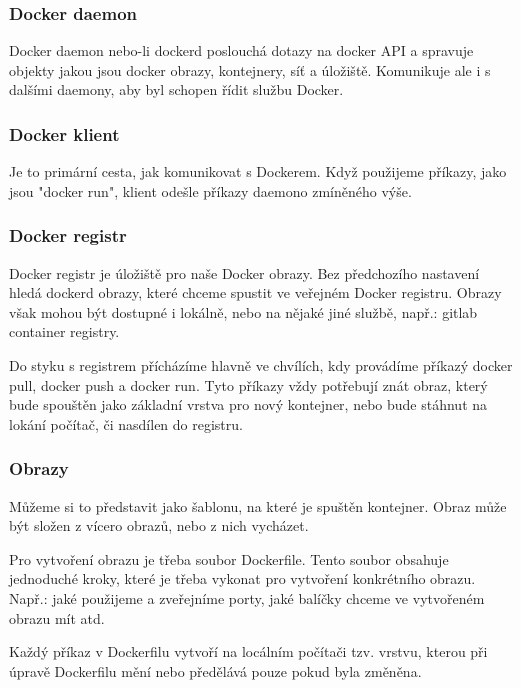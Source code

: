 \subsubsection{Docker daemon}

Docker daemon nebo-li dockerd poslouchá dotazy na docker API a spravuje objekty jakou jsou docker obrazy, kontejnery, síť a úložiště. Komunikuje ale i s dalšími daemony, aby byl schopen řídit službu Docker.

\subsubsection{Docker klient}

Je to primární cesta, jak komunikovat s Dockerem. Když použijeme příkazy, jako jsou "docker run", klient odešle příkazy daemono zmíněného výše. 

\subsubsection{Docker registr}

Docker registr je úložiště pro naše Docker obrazy. Bez předchozího nastavení hledá dockerd obrazy, které chceme spustit ve veřejném Docker registru. Obrazy však mohou být dostupné i lokálně, nebo na nějaké jiné službě, např.: gitlab container registry. 

Do styku s registrem přícházíme hlavně ve chvílích, kdy provádíme příkazý docker pull, docker push a docker run. Tyto příkazy vždy potřebují znát obraz, který bude spouštěn jako základní vrstva pro nový kontejner, nebo bude stáhnut na lokání počítač, či nasdílen do registru.

\subsubsection{Obrazy}

Můžeme si to představit jako šablonu, na které je spuštěn kontejner. Obraz může být složen z vícero obrazů, nebo z nich vycházet. 

Pro vytvoření obrazu je třeba soubor Dockerfile. Tento soubor obsahuje jednoduché kroky, které je třeba vykonat pro vytvoření konkrétního obrazu. Např.: jaké použijeme a zveřejníme porty, jaké balíčky chceme ve vytvořeném obrazu mít atd. 

Každý příkaz v Dockerfilu vytvoří na locálním počítači tzv. vrstvu, kterou při úpravě Dockerfilu mění nebo předělává pouze pokud byla změněna. 

